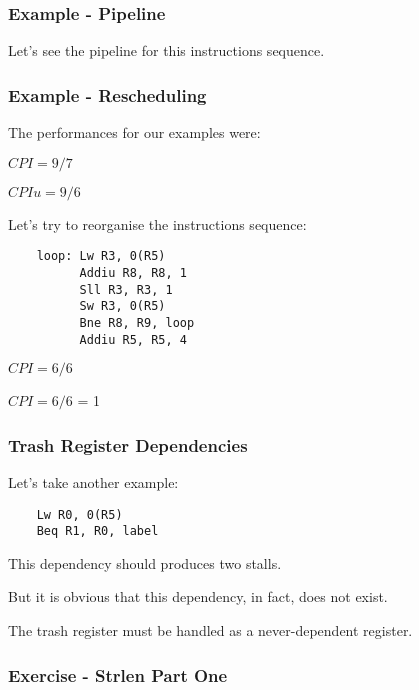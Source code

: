 
\begin{frame}
  \frametitle{Example - Pipeline}

  Let's see the pipeline for this instructions sequence.

  \begin{center}
  \end{center}
\end{frame}


\begin{frame}[containsverbatim]
  \frametitle{Example - Rescheduling}

  The performances for our examples were:

  \nl

  $CPI = 9 / 7$

  $CPIu = 9 / 6$

  \nl

  Let's try to reorganise the instructions sequence:

  \begin{verbatim}
    loop: Lw R3, 0(R5)
          Addiu R8, R8, 1
          Sll R3, R3, 1
          Sw R3, 0(R5)
          Bne R8, R9, loop
          Addiu R5, R5, 4
  \end{verbatim}

  \nl

  $CPI = 6 / 6$

  $CPI = 6 / 6$ \alert{= 1}
\end{frame}


\begin{frame}[containsverbatim]
  \frametitle{Trash Register Dependencies}

  Let's take another example:

  \begin{verbatim}
    Lw R0, 0(R5)
    Beq R1, R0, label
  \end{verbatim}

  This dependency should produces two stalls.

  \nl

  But it is obvious that this dependency, in fact, does not exist.

  \nl

  The trash register must be handled as a never-dependent register.
\end{frame}


\begin{frame}
  \frametitle{Exercise - Strlen Part One}

  \begin{center}
  \end{center}
\end{frame}

